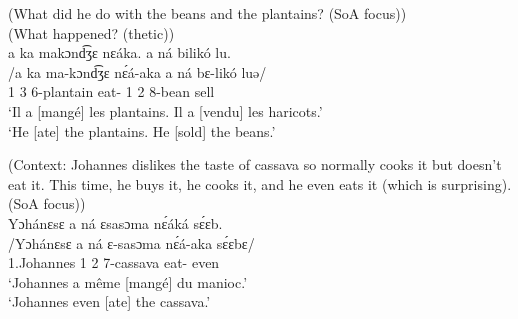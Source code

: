 \documentclass[output=paper,colorlinks,citecolor=brown
]{langscibook}
\begin{document}
\z

\ea
\label{contrastiveobject1}
(What did he do with the beans and the plantains? (SoA focus)) \\ (What happened? (thetic)) \\
\glll
{\db}a ka makɔnd͡ʒɛ nɛáka. a ná bilikó lu.  \\
/a ka ma-kɔnd͡ʒɛ nɛ́á-aka a ná bɛ-likó luə/ \\
{\db}1\SM{} \PST{}3{} 6-plantain eat-\DUR{} 1\SM{} \PST{}2{} 8-bean sell \\
\glt
`Il a [mangé]\textsubscript{\FOC{}}  les plantains. Il a [vendu]\textsubscript{\FOC{}}  les haricots.' \\ `He [ate]\textsubscript{\FOC{}} the plantains. He [sold]\textsubscript{\FOC{}}  the beans.' \jambox*{[JO 908] }


\z
\ea
\label{eveneatmanioc}
(Context: Johannes dislikes the taste of cassava so normally cooks it but doesn't eat it. This time, he buys it, he cooks it, and he even eats it (which is surprising). (SoA focus)) \\
\glll
{\db}Yɔhánɛsɛ	a ná	ɛsasɔma	nɛ́áká	sɛ́ɛb. \\
/Yɔhánɛsɛ	a ná	ɛ-sasɔma	nɛ́á-aka	sɛ́ɛbɛ/ \\
{\db}1.Johannes 1\SM{} \PST{}2{} 7-cassava eat-\DUR{} even \\
\glt
`Johannes a même [mangé]\textsubscript{\FOC{}} du manioc.' \\`Johannes even [ate]\textsubscript{\FOC{}} the cassava.' \jambox*{[PM 2282] }


\z
\end{document}
